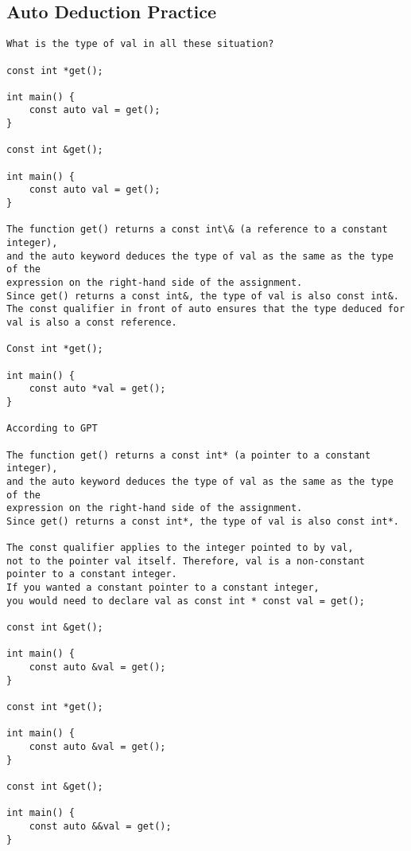 \subsection{Auto Deduction Practice}

\begin{verbatim}
What is the type of val in all these situation?

const int *get();

int main() {
    const auto val = get();
}

const int &get();

int main() {
    const auto val = get();
}

The function get() returns a const int\& (a reference to a constant integer),
and the auto keyword deduces the type of val as the same as the type of the
expression on the right-hand side of the assignment.
Since get() returns a const int&, the type of val is also const int&.
The const qualifier in front of auto ensures that the type deduced for
val is also a const reference.

Const int *get();

int main() {
    const auto *val = get();
}

According to GPT

The function get() returns a const int* (a pointer to a constant integer),
and the auto keyword deduces the type of val as the same as the type of the
expression on the right-hand side of the assignment.
Since get() returns a const int*, the type of val is also const int*.

The const qualifier applies to the integer pointed to by val,
not to the pointer val itself. Therefore, val is a non-constant pointer to a constant integer.
If you wanted a constant pointer to a constant integer,
you would need to declare val as const int * const val = get();

const int &get();

int main() {
    const auto &val = get();
}

const int *get();

int main() {
    const auto &val = get();
}

const int &get();

int main() {
    const auto &&val = get();
}
\end{verbatim}
